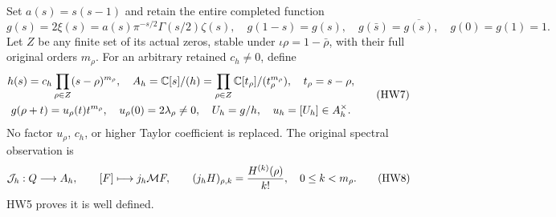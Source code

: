 Set \(a(s)=s(s-1)\) and retain the entire completed function
\[
 g(s)=2\xi(s)=a(s)\pi^{-s/2}\Gamma(s/2)\zeta(s),\quad
 g(1-s)=g(s),\quad g(\bar s)=\overline{g(s)},\quad g(0)=g(1)=1.
 \tag{HW6}
\]
Let \(Z\) be any finite set of its actual zeros, stable under
\(\iota\rho=1-\bar\rho\), with their full original orders \(m_\rho\).
For an arbitrary retained \(c_h\ne0\), define
\[
 \begin{gathered}
 h(s)=c_h\prod_{\rho\in Z}(s-\rho)^{m_\rho},\quad
 A_h=\mathbb C[s]/(h)=\prod_{\rho\in Z}\mathbb C[t_\rho]/(t_\rho^{m_\rho}),
       \quad t_\rho=s-\rho,\\
 g(\rho+t)=u_\rho(t)t^{m_\rho},\quad
 u_\rho(0)=2\lambda_\rho\ne0,\quad
 U_h=g/h,\quad u_h=[U_h]\in A_h^\times.
 \end{gathered}
 \tag{HW7}\label{hw:packet}
\]
No factor \(u_\rho\), \(c_h\), or higher Taylor coefficient is
replaced. The original spectral observation is
\[
 \mathcal J_h:Q\longrightarrow A_h,\qquad
 [F]\longmapsto j_h\mathcal M F,\qquad
 (j_h H)_{\rho,k}=\frac{H^{(k)}(\rho)}{k!},\quad 0\le k<m_\rho .
 \tag{HW8}\label{hw:jetmap}
\]
HW5 proves it is well defined.

